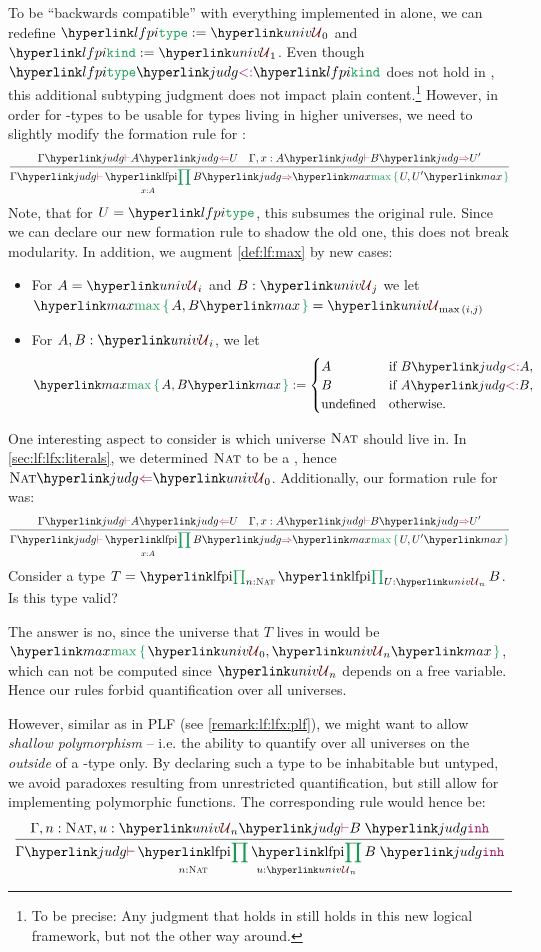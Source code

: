 To be ``backwards compatible'' with everything implemented in \LF alone, we can redefine $\type:=\univ0$ and $\kind:=\univ1$. Even though $\subtp\type\kind$ does not hold in \LF, this additional subtyping judgment does not impact plain \LF content.\footnote{To be precise: Any judgment that holds in \LF still holds in this new logical framework, but not the other way around.} However, in order for \lfpisym-types to be usable for types living in higher universes, we need to slightly modify the formation rule for \lfpisym:
\[
\irule{\gjudg{\hastype A U} \quad \judg{\Gamma,x : A}{\infertype B {U'}} }{\gjudg{\infertype {\lfpi{x:A}B}{\umax{U,U'}} }} 
\]
Note, that for $U=\type$, this subsumes the original rule. Since we can declare our new formation rule to shadow the old one, this does not break modularity. In addition, we augment \autoref{def:lf:max} by new cases:
\begin{definition}
\begin{itemize}
	\item For $A=\univ i$ and $B:\univ j$ we let $\umax{A,B}=\univ{\max{(i,j)}}$	
	\item For $A,B:\univ i$, we let 
		\[\umax{A,B}:=\begin{cases}A & \text{if }\subtp BA, \\ B & \text{if }\subtp AB, \\ \text{undefined} & \text{otherwise.}\end{cases}\]
\end{itemize}
\end{definition}

\begin{remark}[Polymorphism]\label{rem:lf:lfx:univ:poly}
One interesting aspect to consider is which universe $\textsc{Nat}$ should live in. In \autoref{sec:lf:lfx:literals}, we determined $\textsc{Nat}$ to be a \type, hence $\hastype\nat{\univ0}$. Additionally, our formation rule for \lfpisym was:
\[
\irule{\gjudg{\hastype A U} \quad \judg{\Gamma,x : A}{\infertype B {U'}} }{\gjudg{\infertype {\lfpi{x:A}B}{\umax{U,U'}} }} 
\]
Consider a type $T=\lfpi{n:\nat}{\lfpi{U:\univ n}{B}}$. Is this type valid?

The answer is no, since the universe that $T$ lives in would be $\umax{\univ0,\univ n}$, which can not be computed since $\univ n$ depends on a free variable. Hence our rules forbid quantification over all universes.

However, similar as in PLF (see \autoref{remark:lf:lfx:plf}), we might want to allow \emph{shallow polymorphism} -- i.e. the ability to quantify over all universes on the \emph{outside} of a \lfpisym-type only. By declaring such a type to be inhabitable but untyped, we avoid paradoxes resulting from unrestricted quantification, but still allow for implementing polymorphic functions. The corresponding rule would hence be:
\[
	\irule{\judg{\Gamma,n:\nat,u:\univ n}{\judginh B}}{\gjudg{\judginh{\lfpi{n:\nat}{\lfpi{u:\univ n}B}}}}
\]
\end{remark}

